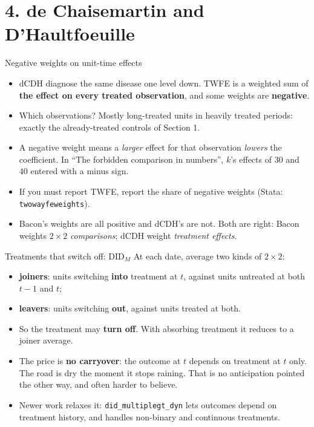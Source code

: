 \documentclass[
  11pt,
  ignorenonframetext,
  aspectratio=169,
]{beamer}
\providecommand{\tightlist}{%
  \setlength{\itemsep}{0pt}\setlength{\parskip}{0pt}}
\begin{document}
\section{4. de Chaisemartin and
D'Haultfoeuille}\label{de-chaisemartin-and-dhaultfoeuille}

\begin{frame}[fragile]{Negative weights on unit-time effects}
\protect{}\label{negative-weights-on-unit-time-effects}
\begin{itemize}
\tightlist
\item
  dCDH diagnose the same disease one level down. TWFE is a weighted sum
  of \textbf{the effect on every treated observation}, and some weights
  are \textbf{negative}.
\item
  Which observations? Mostly long-treated units in heavily treated
  periods: exactly the already-treated controls of Section 1.
\item
  A negative weight means a \emph{larger} effect for that observation
  \emph{lowers} the coefficient. In ``The forbidden comparison in
  numbers'', \(k\)'s effects of \(30\) and \(40\) entered with a minus
  sign.
\item
  If you must report TWFE, report the share of negative weights (Stata:
  \texttt{twowayfeweights}).
\item
  Bacon's weights are all positive and dCDH's are not. Both are right:
  Bacon weights \(2 \times 2\) \emph{comparisons}; dCDH weight
  \emph{treatment effects}.
\end{itemize}
\end{frame}

\begin{frame}[fragile]{Treatments that switch off: \(\text{DID}_M\)}
\protect{}\label{treatments-that-switch-off-textdid_m}
At each date, average two kinds of \(2 \times 2\):

\begin{itemize}
\tightlist
\item
  \textbf{joiners}: units switching \textbf{into} treatment at \(t\),
  against units untreated at both \(t-1\) and \(t\);
\item
  \textbf{leavers}: units switching \textbf{out}, against units treated
  at both.
\end{itemize}

\vspace{0.3em}

\begin{itemize}
\tightlist
\item
  So the treatment may \textbf{turn off}. With absorbing treatment it
  reduces to a joiner average.
\item
  The price is \textbf{no carryover}: the outcome at \(t\) depends on
  treatment at \(t\) only. The road is dry the moment it stops raining.
  That is no anticipation pointed the other way, and often harder to
  believe.
\item
  Newer work relaxes it: \texttt{did\_multiplegt\_dyn} lets outcomes
  depend on treatment history, and handles non-binary and continuous
  treatments.
\end{itemize}
\end{frame}
\end{document}
